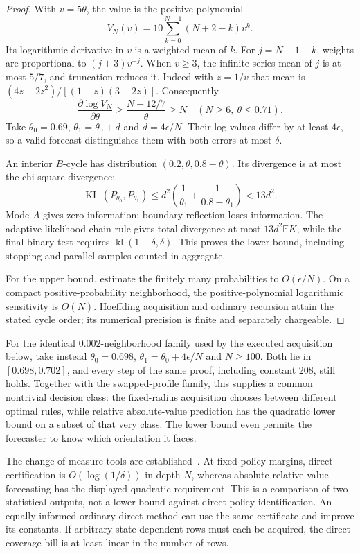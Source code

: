 \documentclass[10pt,a4paper]{article}
\newcommand{\E}{\mathbb E}\newcommand{\Pp}{\mathbb P}
\newcommand{\kl}{\operatorname{kl}}\newcommand{\KL}{\operatorname{KL}}
\begin{document}
\begin{proof}
With $v=5\theta$, the value is the positive polynomial
\[
V_N(v)=10\sum_{k=0}^{N-1}(N+2-k)v^k.
\]
Its logarithmic derivative in $v$ is a weighted mean of $k$. For $j=N-1-k$, weights are proportional to $(j+3)v^{-j}$. When $v\ge3$, the infinite-series mean of $j$ is at most $5/7$, and truncation reduces it. Indeed with $z=1/v$ that mean is
$(4z-2z^2)/[(1-z)(3-2z)]$. Consequently
\[
\frac{\partial\log V_N}{\partial\theta}
\ge\frac{N-12/7}{\theta}\ge N
\quad (N\ge6,\ \theta\le0.71).
\]
Take $\theta_0=0.69$, $\theta_1=\theta_0+d$ and $d=4\epsilon/N$. Their log values differ by at least $4\epsilon$, so a valid forecast distinguishes them with both errors at most $\delta$.

An interior $B$-cycle has distribution $(0.2,\theta,0.8-\theta)$. Its divergence is at most the chi-square divergence:
\[
\KL(P_{\theta_0},P_{\theta_1})
\le d^2\left(\frac1{\theta_1}+\frac1{0.8-\theta_1}\right)<13d^2.
\]
Mode $A$ gives zero information; boundary reflection loses information. The adaptive likelihood chain rule gives total divergence at most $13d^2\E K$, while the final binary test requires $\kl(1-\delta,\delta)$. This proves the lower bound, including stopping and parallel samples counted in aggregate.

For the upper bound, estimate the finitely many probabilities to $O(\epsilon/N)$. On a compact positive-probability neighborhood, the positive-polynomial logarithmic sensitivity is $O(N)$. Hoeffding acquisition and ordinary recursion attain the stated cycle order; its numerical precision is finite and separately chargeable.
\end{proof}

For the identical $0.002$-neighborhood family used by the executed acquisition below, take instead $\theta_0=0.698$, $\theta_1=\theta_0+4\epsilon/N$ and $N\ge100$. Both lie in $[0.698,0.702]$, and every step of the same proof, including constant 208, still holds. Together with the swapped-profile family, this supplies a common nontrivial decision class: the fixed-radius acquisition chooses between different optimal rules, while relative absolute-value prediction has the quadratic lower bound on a subset of that very class. The lower bound even permits the forecaster to know which orientation it faces.

The change-of-measure tools are established~\cite{kaufmann,garivier,nitinawarat}. At fixed policy margins, direct certification is $O(\log(1/\delta))$ in depth $N$, whereas absolute relative-value forecasting has the displayed quadratic requirement. This is a comparison of two statistical outputs, not a lower bound against direct policy identification. An equally informed ordinary direct method can use the same certificate and improve its constants. If arbitrary state-dependent rows must each be acquired, the direct coverage bill is at least linear in the number of rows.
\end{document}
